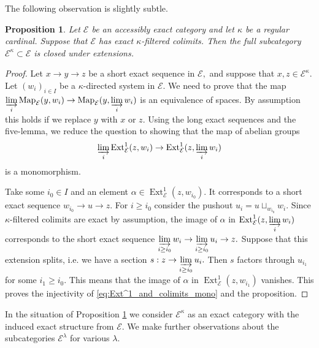 \documentclass[11pt,leqno]{amsart}
\newtheorem{prop}[theo]{Proposition}
\numberwithin{equation}{section}
\def\Map{\operatorname{Map}}
\newcommand{\indlim}[1][]{\mathop{\varinjlim}\limits_{#1}}
\newcommand{\cE}{{\mathcal E}}
\newcommand{\Ext}{\operatorname{Ext}}
\begin{document}
The following observation is slightly subtle.

\begin{prop}\label{prop:kappa_compact_closed_under_extensions}
Let $\cE$ be an accessibly exact category and let $\kappa$ be a regular cardinal. Suppose that $\cE$ has exact $\kappa$-filtered colimits. Then the full subcategory $\cE^{\kappa}\subset\cE$ is closed under extensions.
\end{prop}

\begin{proof}
Let $x\to y\to z$ be a short exact sequence in $\cE,$ and suppose that $x,z\in\cE^{\kappa}.$ Let $(w_i)_{i\in I}$ be a $\kappa$-directed system in $\cE.$ We need to prove that the map $\indlim[i]\Map_{\cE}(y,w_i)\to \Map_{\cE}(y,\indlim[i]w_i)$ is an equivalence of spaces. By assumption this holds if we replace $y$ with $x$ or $z.$ Using the long exact sequences and the five-lemma, we reduce the question to showing that the map of abelian groups 
\begin{equation}\label{eq:Ext^1_and_colimits_mono}
\indlim[i]\Ext^1_{\cE}(z,w_i)\to \Ext^1_{\cE}(z,\indlim[i] w_i)
\end{equation} 
is a monomorphism.

Take some $i_0\in I$ and an element $\alpha\in\Ext^1_{\cE}(z,w_{i_0}).$ It corresponds to a short exact sequence $w_{i_0}\to u\to z.$ For $i\geq i_0$ consider the pushout $u_i=u\sqcup_{w_{i_0}}w_i.$ Since $\kappa$-filtered colimits are exact by assumption, the image of $\alpha$ in $\Ext^1_{\cE}(z,\indlim[i]w_i)$ corresponds to the short exact sequence $\indlim[i\geq i_0]w_i\to \indlim[i\geq i_0]u_i\to z.$ Suppose that this extension splits, i.e. we have a section $s:z\to\indlim[i\geq i_0] u_i.$ Then $s$ factors through $u_{i_1}$ for some $i_1\geq i_0.$ This means that the image of $\alpha$ in $\Ext^1_{\cE}(z,w_{i_1})$ vanishes. This proves the injectivity of \eqref{eq:Ext^1_and_colimits_mono} and the proposition. 
\end{proof}

In the situation of Proposition \ref{prop:kappa_compact_closed_under_extensions} we consider $\cE^{\kappa}$ as an exact category with the induced exact structure from $\cE.$ We make further observations about the subcategories $\cE^{\lambda}$ for various $\lambda.$
\end{document}

